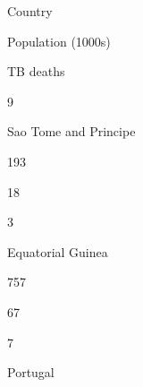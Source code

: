 \documentclass[letterpaper,10pt,english]{sphinxmanual}
\begin{document}



















Country





Population (1000s)





TB deaths









9





Sao Tome and Principe





193





18









3





Equatorial Guinea





757





67









7





Portugal
\end{document}
